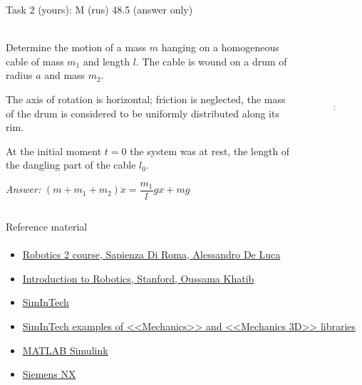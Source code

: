 \documentclass[aspectratio=169]{beamer}
\newcommand{\fbckg}[1]{\usebackgroundtemplate{\texttt{[image: \#1]}}}%
\begin{document}
\begin{frame}[t]{Task 2 (yours): M (rus) 48.5 (answer only)}
\framesubtitle{}
\begin{columns}[T,onlytextwidth]
    \begin{column}{0.59\textwidth}
        Determine the motion of a mass $m$ hanging on a homogeneous cable of mass $m_1$ and length $l$. The cable is wound on a drum of radius $a$ and mass $m_2$.
        \medskip

        The axis of rotation is horizontal; friction is neglected, the mass of the drum is considered to be uniformly distributed along its rim. 
        
        At the initial moment $t=0$ the system was at rest, the length of the dangling part of the cable $l_0$.
        \bigskip

        \textit{Answer:} $(m+m_1+m_2)\ddot{x} = \dfrac{m_1}{l}gx + mg$
    \end{column}
    \begin{column}{0.39\textwidth}
        \begin{figure}[H]
            \centering\includegraphics[height=5cm,width=1\textwidth,keepaspectratio]{im11.png}
            \label{fig:im11.png}
        \end{figure}
    \end{column}
\end{columns}    
\end{frame}


\begin{frame}[t]{Reference material}
\framesubtitle{}
    \begin{itemize}
        \item \href{https://www.diag.uniroma1.it/deluca/rob2_en.php}{Robotics 2 course, Sapienza Di Roma, Alessandro De Luca}
        \item \href{https://see.stanford.edu/Course/CS223A}{Introduction to Robotics, Stanford, Oussama Khatib}
        \item \href{https://simintech.ru/}{SimInTech}
        \item \href{https://help.simintech.ru/index.html?q=/15_demonstracionnye_primery/KEY_demonstracionnye_primery.html}{SimInTech examples of <<Mechanics>> and <<Mechanics 3D>> libraries}
        \item \href{https://www.mathworks.com/products/simulink.html}{MATLAB Simulink}
        \item \href{https://en.wikipedia.org/wiki/Siemens_NX}{Siemens NX}
    \end{itemize}
\end{frame}
\fbckg{fibeamer/figs/last_page.png}
\frame[plain]{}
\end{document}
